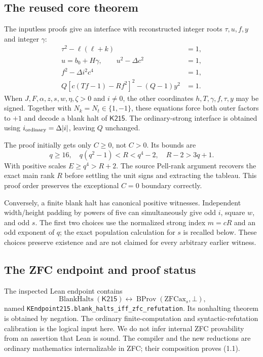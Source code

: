 \documentclass[11pt]{article}
\theoremstyle{remark}\newtheorem{remark}[theorem]{Remark}
\newcommand{\KTM}{\mathsf{K215}}
\begin{document}
\subsection{The reused core theorem}

The inputless proofs \cite{blank,ordinary,signed,oddscale} give an
interface with reconstructed integer roots \(\tau,u,f,y\) and
integer \(\gamma\):
\begin{align}
\tau^2-\ell(\ell+k)&=1,\nonumber\\
u=b_0+H\gamma,\qquad u^2-\Delta c^2&=1,\nonumber\\
f^2-\Delta i^2c^4&=1,\tag{2.8}\\
Q[c(Tf-1)-Rf^2]^2-(Q-1)y^2&=1.\nonumber
\end{align}
When \(J,F,\alpha,z,s,w,\eta,\zeta>0\) and \(i\ne0\), the other
coordinates \(h,T,\gamma,f,\tau,y\) may be signed.
Together with \(N_k=N_t\in\{1,-1\}\), these equations force
both outer factors to \(+1\) and decode a blank halt of \(\KTM\).
The ordinary-strong interface is obtained using
\(i_{\rm ordinary}=\Delta|i|\), leaving \(Q\) unchanged.

The proof initially gets only \(C\ge0\), not \(C>0\). Its bounds are
\[
q\ge16,\quad q(q^2-1)<R<q^4-2,\quad R-2>3q+1.
\tag{2.9}
\]
With positive scales \(E\ge q^4>R+2\).
The source Pell-rank argument recovers the exact main rank \(R\)
before settling the unit signs and extracting the tableau.
This proof order preserves the exceptional \(C=0\) boundary correctly.

Conversely, a finite blank halt has canonical positive witnesses.
Independent width/height padding by powers of five can simultaneously
give odd \(i\), square \(w\), and odd \(s\). The first two choices
use the normalized strong index \(m=cR\) and an odd exponent of \(q\);
the exact population calculation for \(s\) is recalled below.
These choices preserve existence and are not claimed for every
arbitrary earlier witness.

\subsection{The ZFC endpoint and proof status}

The inspected Lean endpoint \cite{endpoint} contains
\[
\operatorname{BlankHalts}(\KTM)
\longleftrightarrow\operatorname{BProv}(\mathrm{ZFCax}_s,\bot),
\tag{2.10}
\]
named \texttt{KEndpoint215.blank\_halts\_iff\_zfc\_refutation}.
Its nonhalting theorem is obtained by negation.
The ordinary finite-computation and syntactic-refutation calibration
is the logical input here. We do not infer internal ZFC provability
from an assertion that Lean is sound.
The compiler and the new reductions are ordinary mathematics
internalizable in ZFC; their composition proves (1.1).
\end{document}
